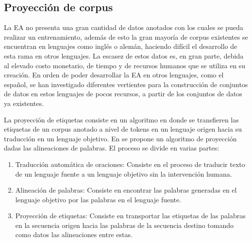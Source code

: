 \documentclass[a4paper,11pt,twocolumn,twoside]{article}
\begin{document}

\subsection{Proyección de corpus} %

La EA no presenta una gran cantidad de datos anotados con los cuales se pueda realizar 
un entrenamiento, además de esto la gran mayoría de corpus existentes se encuentran en lenguajes como inglés o alemán,
haciendo difícil el desarrollo de esta rama en otros lenguajes.
La escasez de estos datos es, en gran parte, debida al elevado costo monetario, de tiempo y de recursos humanos que se utiliza
en su creación. En orden de poder desarrollar la EA en otros lenguajes, como el español, se han investigado diferentes vertientes
para la construcción de conjuntos de datos en estos lenguajes de pocos recursos, a partir de los conjuntos de datos ya 
existentes.

La proyección de etiquetas consiste en un algoritmo en donde se 
transfieren las etiquetas de un corpus anotado a nivel de tokens en un lenguaje origen hacia su traducción en un
lenguaje objetivo. En \cite{eger2018cross} se propone un algoritmo de proyección dadas las alineaciones de 
palabras. El proceso se divide en varias partes:

\begin{enumerate}
	\item Traducción automática de oraciones: Consiste en el proceso de
	traducir texto de un lenguaje fuente a un lenguaje objetivo sin la intervención humana.
	\item Alineación de palabras: Consiste en encontrar las palabras generadas en el lenguaje objetivo por las 
	palabras en el lenguaje fuente.
	\item Proyección de etiquetas: Consiste en transportar las etiquetas de las palabras en la secuencia origen
	hacia las palabras de la secuencia destino tomando como datos las alineaciones entre estas.
\end{enumerate}
\end{document}
